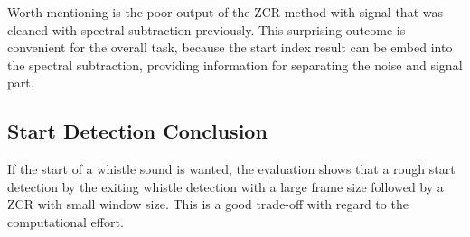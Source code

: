 Worth mentioning is the poor output of the \ac{ZCR} method with
signal that was cleaned with spectral subtraction previously.
This surprising outcome is convenient for the overall task,
because the start index result can be embed into the spectral
subtraction, providing information for separating the noise
and signal part.


\subsection{Start Detection Conclusion}
\label{subsec:04_startDetectionConclusion}

If the start of a whistle sound is wanted, the evaluation shows
that a rough start detection by the exiting whistle detection
with a large frame size followed by a \ac{ZCR} with small
window size.
This is a good trade-off with regard to the computational effort.
